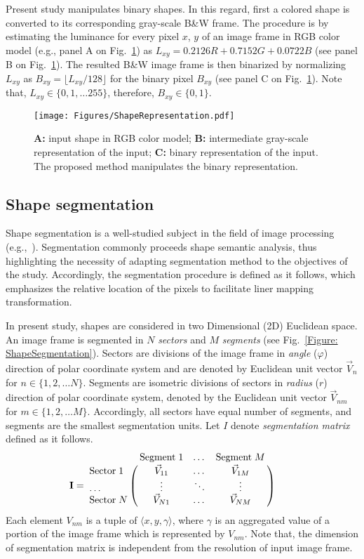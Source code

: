 Present study manipulates binary shapes. In this regard, first a colored shape is converted to its corresponding gray-scale B\&W frame. The procedure is by estimating the luminance for every pixel $x$, $y$ of an image frame in RGB color model (e.g., panel A on Fig.~\ref{Figure: ShapeRepresentation}) as $L_{xy} = 0.2126R + 0.7152G + 0.0722B$ (see panel B on Fig.~\ref{Figure: ShapeRepresentation}). The resulted B\&W image frame is then binarized by normalizing $L_{xy}$ as $B_{xy} = \lfloor L_{xy} / 128 \rfloor$ for the binary pixel $B_{xy}$ (see panel C on Fig.~\ref{Figure: ShapeRepresentation}). Note that, $L_{xy} \in \{0, 1, \dots 255\}$, therefore, $B_{xy} \in \{0, 1\}$.

\begin{figure}[!t]
	\centering
	\texttt{[image: Figures/ShapeRepresentation.pdf]}
	\caption
	{
		\textbf{A:} input shape in RGB color model; \textbf{B:} intermediate gray-scale representation of the input; \textbf{C:} binary representation of the input. The proposed method manipulates the binary representation.
	}
	\label{Figure: ShapeRepresentation}
\end{figure}


\subsection{Shape segmentation} \label{section: Shape Segmentation}
Shape segmentation is a well-studied subject in the field of image processing (e.g.,~\cite{pal1993review}). Segmentation commonly proceeds shape semantic analysis, thus highlighting the necessity of adapting segmentation method to the objectives of the study. Accordingly, the segmentation procedure is defined as it follows, which emphasizes the relative location of the pixels to facilitate liner mapping transformation.

In present study, shapes are considered in two Dimensional (2D) Euclidean space. An image frame is segmented in $N$ \textit{sectors} and $M$ \textit{segments} (see Fig.~\ref{Figure: ShapeSegmentation}). Sectors are divisions of the image frame in \textit{angle} ($\varphi$) direction of polar coordinate system and are denoted by Euclidean unit vector $\vec{V}_n$ for $n\in\{1,2, \dots N\}$. Segments are isometric divisions of sectors in \textit{radius} ($r$) direction of polar coordinate system, denoted by the Euclidean unit vector $\vec{V}_{nm}$ for $m \in \{1,2, \dots M\}$. Accordingly, all sectors have equal number of segments, and segments are the smallest segmentation units. Let $I$ denote \textit{segmentation matrix} defined as it follows.
\[
\mathbf{I} =
\bordermatrix{ & \text{Segment} \; 1             & \dots & \text{Segment} \; M  \cr
	  \text{Sector} \; 1 & \vec{V}_{11} & \dots  & \vec{V}_{1M}       \cr
	     \dots & \vdots       & \ddots & \vdots             \cr
	  \text{Sector} \; N & \vec{V}_{N1} & \dots  & \vec{V}_{NM}}      \qquad
\]
\noindent
Each element $V_{nm}$ is a tuple of $\langle x, y, \gamma \rangle$, where $\gamma$ is an aggregated value of a portion of the image frame which is represented by $V_{nm}$. Note that, the dimension of segmentation matrix is independent from the resolution of input image frame. 

